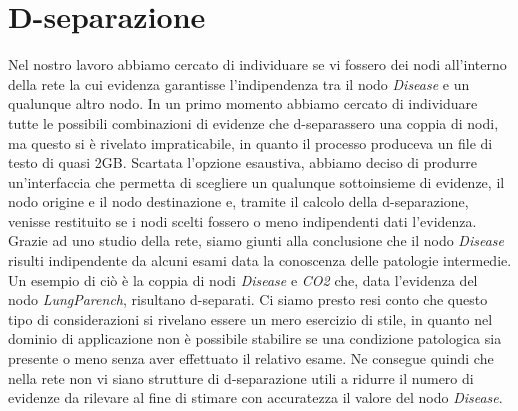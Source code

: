 \section{D-separazione}
Nel nostro lavoro abbiamo cercato di individuare se vi fossero dei nodi all'interno della rete la cui evidenza garantisse l'indipendenza tra il nodo \textit{Disease} e un qualunque altro nodo. In un primo momento abbiamo cercato di individuare tutte le possibili combinazioni di evidenze che d-separassero una coppia di nodi, ma questo si è rivelato impraticabile, in quanto il processo produceva un file di testo di quasi 2GB. Scartata l'opzione esaustiva, abbiamo deciso di produrre un'interfaccia che permetta di scegliere un qualunque sottoinsieme di evidenze, il nodo origine e il nodo destinazione e, tramite il calcolo della d-separazione, venisse restituito se i nodi scelti fossero o meno indipendenti dati l'evidenza. 
Grazie ad uno studio della rete, siamo giunti alla conclusione che il nodo \textit{Disease} risulti indipendente da alcuni esami data la conoscenza delle patologie intermedie. Un esempio di ciò è la coppia di nodi \textit{Disease} e \textit{CO2} che, data l'evidenza del nodo \textit{LungParench}, risultano d-separati. Ci siamo presto resi conto che questo tipo di considerazioni si rivelano essere un mero esercizio di stile, in quanto nel dominio di applicazione non è possibile stabilire se una condizione patologica sia presente o meno senza aver effettuato il relativo esame. Ne consegue quindi che nella rete non vi siano strutture di d-separazione utili a ridurre il numero di evidenze da rilevare al fine di stimare con accuratezza il valore del nodo \textit{Disease}.

